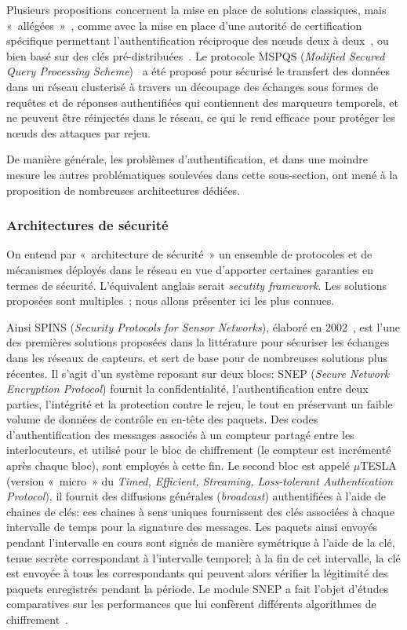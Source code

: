 Plusieurs propositions concernent la mise en place de solutions classiques, mais « allégées »~\cite{HWMRKP06}, comme avec la mise en place d'une autorité de certification spécifique permettant l'authentification réciproque des nœuds deux à deux~\cite{GWZCK13}, ou bien basé sur des clés pré-distribuées~\cite{BSK13}.
Le protocole MSPQS (\textit{Modified Secured Query Processing Scheme})~\cite{GD14} a été proposé pour sécurisé le transfert des données dans un réseau clusterisé à travers un découpage des échanges sous formes de requêtes et de réponses authentifiées qui contiennent des marqueurs temporels, et ne peuvent être réinjectés dans le réseau, ce qui le rend efficace pour protéger les nœuds des attaques par rejeu.

De manière générale, les problèmes d'authentification, et dans une moindre mesure les autres problématiques soulevées dans cette sous-section, ont mené à la proposition de nombreuses architectures dédiées.

    \subsubsection{Architectures de sécurité}\label{ea:sss:archi}
On entend par « architecture de sécurité » un ensemble de protocoles et de mécanismes déployés dans le réseau en vue d'apporter certaines garanties en termes de sécurité.
L'équivalent anglais serait \textit{secutity framework}.
Les solutions proposées sont multiples~\cite{HI12,GWZC13,SS14-rev}; nous allons présenter ici les plus connues.

Ainsi SPINS (\textit{Security Protocols for Sensor Networks}), élaboré en 2002~\cite{PSWCT02}, est l'une des premières solutions proposées dans la littérature pour sécuriser les échanges dans les réseaux de capteurs, et sert de base pour de nombreuses solutions plus récentes.
Il s'agit d'un système reposant sur deux blocs: SNEP (\textit{Secure Network Encryption Protocol}) fournit la confidentialité, l'authentification entre deux parties, l'intégrité et la protection contre le rejeu, le tout en préservant un faible volume de données de contrôle en en-tête des paquets.
Des codes d'authentification des messages associés à un compteur partagé entre les interlocuteurs, et utilisé pour le bloc de chiffrement (le compteur est incrémenté après chaque bloc), sont employés à cette fin.
Le second bloc est appelé $\mu$TESLA (version « micro » du \textit{Timed, Efficient, Streaming, Loss-tolerant Authentication Protocol}), il fournit des diffusions générales (\textit{broadcast}) authentifiées à l'aide de chaines de clés: ces chaines à sens uniques fournissent des clés associées à chaque intervalle de temps pour la signature des messages.
Les paquets ainsi envoyés pendant l'intervalle en cours sont signés de manière symétrique à l'aide de la clé, tenue secrète correspondant à l'intervalle temporel; à la fin de cet intervalle, la clé est envoyée à tous les correspondants qui peuvent alors vérifier la légitimité des paquets enregistrés pendant la période.
Le module SNEP a fait l'objet d'études comparatives sur les performances que lui confèrent différents algorithmes de chiffrement~\cite{SS14-snep}.

